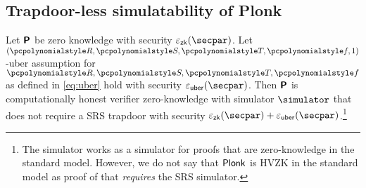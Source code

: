 \subsection{Trapdoor-less simulatability of Plonk}
\begin{lemma}
  \label{lem:plonk_hvzk}
  Let $\bm{\mathsf{P}}$ be zero knowledge with security $\epszk(\secpar)$. Let
  $(\pR, \pS, \pT, \pf, 1)$-uber assumption for $\pR, \pS, \pT, \pf$ as defined
  in \cref{eq:uber} hold with security $\epsuber(\secpar)$. Then $\bm{\mathsf{P}}$ is
  computationally honest verifier zero-knowledge with simulator $\simulator$
  that does not require a SRS trapdoor with security
  $\epszk(\secpar) + \epsuber(\secpar)$.\footnote{The simulator works as a simulator for proofs
    that are zero-knowledge in the standard model. However, we do not say that
    $\textnormal{\textsf{Plonk}}$ is HVZK in the standard model as proof of that \emph{requires} the
    SRS simulator.}
\end{lemma}
